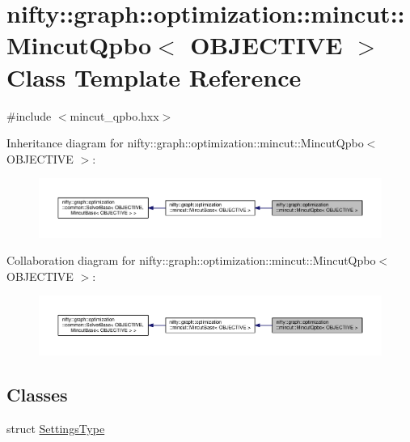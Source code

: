 \hypertarget{classnifty_1_1graph_1_1optimization_1_1mincut_1_1MincutQpbo}{}\section{nifty\+:\+:graph\+:\+:optimization\+:\+:mincut\+:\+:Mincut\+Qpbo$<$ O\+B\+J\+E\+C\+T\+I\+V\+E $>$ Class Template Reference}
\label{classnifty_1_1graph_1_1optimization_1_1mincut_1_1MincutQpbo}


{\ttfamily \#include $<$mincut\+\_\+qpbo.\+hxx$>$}



Inheritance diagram for nifty\+:\+:graph\+:\+:optimization\+:\+:mincut\+:\+:Mincut\+Qpbo$<$ O\+B\+J\+E\+C\+T\+I\+V\+E $>$\+:\nopagebreak
\begin{figure}[H]
\begin{center}
\leavevmode
\includegraphics[width=350pt]{classnifty_1_1graph_1_1optimization_1_1mincut_1_1MincutQpbo__inherit__graph}
\end{center}
\end{figure}


Collaboration diagram for nifty\+:\+:graph\+:\+:optimization\+:\+:mincut\+:\+:Mincut\+Qpbo$<$ O\+B\+J\+E\+C\+T\+I\+V\+E $>$\+:\nopagebreak
\begin{figure}[H]
\begin{center}
\leavevmode
\includegraphics[width=350pt]{classnifty_1_1graph_1_1optimization_1_1mincut_1_1MincutQpbo__coll__graph}
\end{center}
\end{figure}
\subsection*{Classes}
\begin{DoxyCompactItemize}
\item 
struct \hyperlink{structnifty_1_1graph_1_1optimization_1_1mincut_1_1MincutQpbo_1_1SettingsType}{Settings\+Type}
\end{DoxyCompactItemize}
